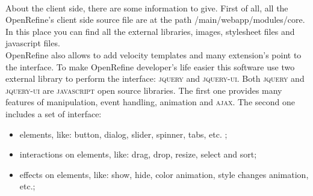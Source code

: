 \paragraph{}
About the client side, there are some information to give. First of all, all the OpenRefine's client side source file are at the path \textsf{/main/webapp/modules/core}. In this place you can find all the external libraries, images, stylesheet files and javascript files. \\ 
OpenRefine also allows to add velocity templates and many extension's point to the interface. To make OpenRefine developer's life easier this software use two external library to perform the interface: \textsc{jquery} and \textsc{jquery-ui}. Both \textsc{jquery} and \textsc{jquery-ui} are \textsc{javascript} open source libraries. The first one provides many features of manipulation, event handling, animation and \textsc{ajax}. The second one includes a set of interface: 
\begin{itemize}
	\item \textsf{elements}, like: button, dialog, slider, spinner, tabs, etc. ;
	\item \textsf{interactions} on elements, like: drag, drop, resize, select and sort;
	\item \textsf{effects} on elements, like: show, hide, color animation, style changes animation, etc.;
\end{itemize}

